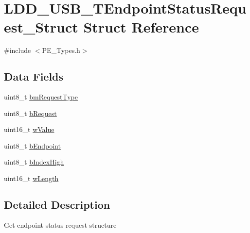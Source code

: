 \hypertarget{struct_l_d_d___u_s_b___t_endpoint_status_request___struct}{\section{L\-D\-D\-\_\-\-U\-S\-B\-\_\-\-T\-Endpoint\-Status\-Request\-\_\-\-Struct Struct Reference}
\label{struct_l_d_d___u_s_b___t_endpoint_status_request___struct}
}


{\ttfamily \#include $<$P\-E\-\_\-\-Types.\-h$>$}

\subsection*{Data Fields}
\begin{DoxyCompactItemize}
\item 
uint8\-\_\-t \hyperlink{struct_l_d_d___u_s_b___t_endpoint_status_request___struct_a2d7155b7316be76989c9c2ff3be46bca}{bm\-Request\-Type}
\item 
uint8\-\_\-t \hyperlink{struct_l_d_d___u_s_b___t_endpoint_status_request___struct_ae8ab1e11dae5a0b3a4b4a7256a542175}{b\-Request}
\item 
uint16\-\_\-t \hyperlink{struct_l_d_d___u_s_b___t_endpoint_status_request___struct_a987fe8c9322a22d8b5118eccd4de42c8}{w\-Value}
\item 
uint8\-\_\-t \hyperlink{struct_l_d_d___u_s_b___t_endpoint_status_request___struct_af6e2c04625ae0703ac3eedd82cbf1fe3}{b\-Endpoint}
\item 
uint8\-\_\-t \hyperlink{struct_l_d_d___u_s_b___t_endpoint_status_request___struct_a0d53fe67e57b45eff01799aaa5720987}{b\-Index\-High}
\item 
uint16\-\_\-t \hyperlink{struct_l_d_d___u_s_b___t_endpoint_status_request___struct_addba57e934f9c77c9159d7be618dd6dc}{w\-Length}
\end{DoxyCompactItemize}


\subsection{Detailed Description}
Get endpoint status request structure 

